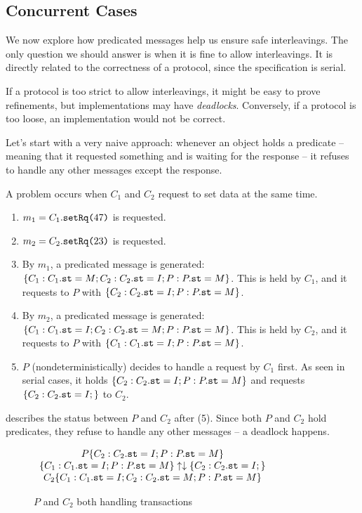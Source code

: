 \documentclass[format=manuscript]{acmart}
\begin{document}
\subsection{Concurrent Cases}\label{concurrent-cases}

We now explore how predicated messages help us ensure safe interleavings. The
only question we should answer is when it is fine to allow interleavings. It is
directly related to the correctness of a protocol, since the specification is
serial.

If a protocol is too strict to allow interleavings, it might be easy to prove
refinements, but implementations may have \emph{deadlocks}. Conversely, if a
protocol is too loose, an implementation would not be correct.

Let's start with a very naive approach: whenever an object holds a predicate --
meaning that it requested something and is waiting for the response -- it
refuses to handle any other messages except the response.

A problem occurs when $C_1$ and $C_2$ request to set data at the same time.

\begin{enumerate}
\item $m_1 = C_1.\texttt{setRq(}47\texttt{)}$ is requested.
\item $m_2 = C_2.\texttt{setRq(}23\texttt{)}$ is requested.
\item By $m_1$, a predicated message is generated: $\{ C_1: C_1.\texttt{st} = M; C_2:
  C_2.\texttt{st} = I; P: P.\texttt{st} = M \}$. This is held by $C_1$, and it requests to
  $P$ with $\{ C_2: C_2.\texttt{st} = I; P: P.\texttt{st} = M \}$.
\item By $m_2$, a predicated message is generated: $\{ C_1: C_1.\texttt{st} = I; C_2:
  C_2.\texttt{st} = M; P: P.\texttt{st} = M \}$. This is held by $C_2$, and it requests to
  $P$ with $\{ C_1: C_1.\texttt{st} = I; P: P.\texttt{st} = M \}$.
\item $P$ (nondeterministically) decides to handle a request by $C_1$ first. As
  seen in serial cases, it holds $\{ C_2: C_2.\texttt{st} = I; P: P.\texttt{st} = M \}$
  and requests $\{ C_2: C_2.\texttt{st} = I; \}$ to $C_2$.
\end{enumerate}

 describes the status between $P$ and $C_2$ after
(5). Since both $P$ and $C_2$ hold predicates, they refuse to handle any other
messages -- a deadlock happens.

\begin{figure}[h]
  \begin{math}
    \begin{array}{c}
      P \{ C_2: C_2.\texttt{st} = I; P: P.\texttt{st} = M \} \\
      \{ C_1: C_1.\texttt{st} = I; P: P.\texttt{st} = M \} \uparrow
      \downarrow \{ C_2: C_2.\texttt{st} = I; \} \\
      C_2 \{ C_1: C_1.\texttt{st} = I; C_2: C_2.\texttt{st} = M; P: P.\texttt{st} = M \}
    \end{array}
  \end{math}
  \caption{$P$ and $C_2$ both handling transactions}
  \label{fig:deadlock}
\end{figure}
\end{document}
